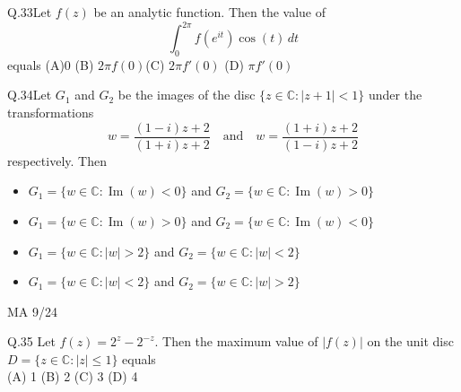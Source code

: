 \documentclass{article}
\begin{document}
																																		 Q.33\quad Let $f(z)$ be an analytic function. Then the value of
																																		 \[
																																		 \int_0^{2\pi} f(e^{it}) \cos(t)\,dt
																																		 \]
																																		 equals
																																		 \newline \noindent (A)$0$ \hspace{2cm} (B) $2\pi f(0)$\hspace{2cm}(C) $2\pi f'(0)$ \hspace{2cm} (D) $\pi f'(0)$


																																		 \vspace{0.5cm}

																																		 Q.34\quad Let $G_1$ and $G_2$ be the images of the disc $\{ z \in \mathbb{C} : |z + 1| < 1 \}$ under the transformations
																																		 \[
																																		 w = \frac{(1 - i)z + 2}{(1 + i)z + 2} \quad \text{and} \quad w = \frac{(1 + i)z + 2}{(1 - i)z + 2}
																																		 \]
																																		 respectively. Then
																																		 \begin{itemize}
																																		   \item[(A)] $G_1 = \{w \in \mathbb{C} : \operatorname{Im}(w) < 0\}$ and $G_2 = \{w \in \mathbb{C} : \operatorname{Im}(w) > 0\}$
																																		     \item[(B)] $G_1 = \{w \in \mathbb{C} : \operatorname{Im}(w) > 0\}$ and $G_2 = \{w \in \mathbb{C} : \operatorname{Im}(w) < 0\}$
																																		       \item[(C)] $G_1 = \{w \in \mathbb{C} : |w| > 2\}$ and $G_2 = \{w \in \mathbb{C} : |w| < 2\}$
																																		         \item[(D)] $G_1 = \{w \in \mathbb{C} : |w| < 2\}$ and $G_2 = \{w \in \mathbb{C} : |w| > 2\}$
																																			 \end{itemize}
																																			 \vspace{2em}
																																			 \begin{center}
																																			     {MA 9/24}
																																			     \end{center}

																																			     \newpage
																																			     Q.35 Let $f(z) = 2^z - 2^{-z}$. Then the maximum value of $|f(z)|$ on the unit disc $D = \{ z \in \mathbb{C} : |z| \leq 1 \}$ equals\\
																																			     (A) 1 \hspace{2cm} (B) 2 \hspace{2cm} (C) 3 \hspace{2cm} (D) 4
\end{document}
